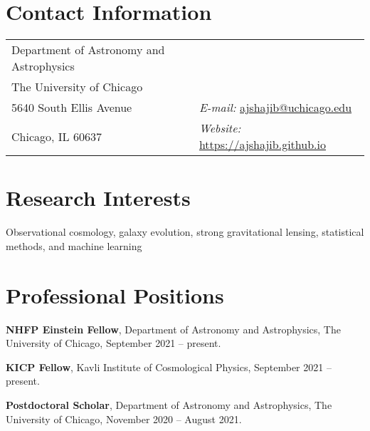 \documentclass[margin, line]{res}
\newenvironment{list1}{
  \begin{list}{\ding{113}}{%
      \setlength{\itemsep}{0in}
      \setlength{\parsep}{0in} \setlength{\parskip}{0in}
      \setlength{\topsep}{0in} \setlength{\partopsep}{0in} 
      \setlength{\leftmargin}{0.17in}}}{\end{list}}
\begin{document}

\begin{resume}


\section{\sc Contact Information}
\vspace{.05in}
\begin{tabular}{@{}p{3in}p{3in}}                  
Department of Astronomy and Astrophysics  \\ %
The University of Chicago  &  \\     
5640 South Ellis Avenue 	         & {\it E-mail:}  \href{mailto:ajshajib@astro.ucla.edu}{ajshajib@uchicago.edu} \\
Chicago, IL 60637  & {\it Website:} \url{https://ajshajib.github.io} \\   
\end{tabular}


\section{\sc Research Interests}
Observational cosmology, galaxy evolution, strong gravitational lensing,  statistical methods, and machine learning

\vspace*{2.5mm}
\section{\sc Professional Positions}

\vspace*{.16in}
\begin{list1}
	\item[] \textbf{NHFP Einstein Fellow}, Department of Astronomy and Astrophysics, The University of Chicago, September 2021 -- present.
	\item[] \textbf{KICP Fellow}, Kavli Institute of Cosmological Physics, September 2021 -- present.
	\item[] \textbf{Postdoctoral Scholar}, Department of Astronomy and Astrophysics, The University of Chicago, November 2020 -- August 2021.
\end{list1}


\end{resume}
\end{document}
